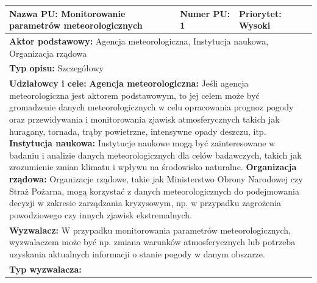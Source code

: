 \documentclass{article}
\begin{document}
\begin{center}
    \begin{center}
        \begin{tabular}{|l|l|l|}
        \hline
        \textbf{Nazwa PU:} Monitorowanie parametrów meteorologicznych & \textbf{Numer PU:} 1 & \textbf{Priorytet:} Wysoki \\
        \hline
        \hline
        \multicolumn{3}{|p{\dimexpr\linewidth-2\tabcolsep-2\arrayrulewidth}|}{\textbf{Aktor podstawowy:} Agencja meteorologiczna, Instytucja naukowa, Organizacja rządowa} \\
        \hline
        \hline
        \multicolumn{3}{|p{\dimexpr\linewidth-2\tabcolsep-2\arrayrulewidth}|}{\textbf{Typ opisu:} Szczegółowy} \\
        \hline
        \hline
        \multicolumn{3}{|p{\dimexpr\linewidth-2\tabcolsep-2\arrayrulewidth}|}{\textbf{Udziałowcy i cele:}
        \newline
        \textbf{Agencja meteorologiczna:}
        \newline
        Jeśli agencja meteorologiczna jest aktorem podstawowym, 
        to jej celem może być gromadzenie danych meteorologicznych w celu opracowania prognoz pogody
        oraz przewidywania i monitorowania zjawisk atmosferycznych takich jak huragany, tornada, trąby powietrzne,
        intensywne opady deszczu, itp.
        \newline 
        \textbf{Instytucja naukowa:}
        \newline
        Instytucje naukowe mogą być zainteresowane w badaniu i analizie danych meteorologicznych 
        dla celów badawczych, takich jak zrozumienie zmian klimatu i wpływu na środowisko naturalne.
        \newline
        \textbf{Organizacja rządowa:}
        \newline
        Organizacje rządowe, takie jak Ministerstwo Obrony Narodowej czy Straż Pożarna, mogą korzystać z
        danych meteorologicznych do podejmowania decyzji w zakresie zarządzania kryzysowym, np. w przypadku zagrożenia powodziowego
        czy innych zjawisk ekstremalnych. } \\
        \hline
        \hline
        \multicolumn{3}{|p{\dimexpr\linewidth-2\tabcolsep-2\arrayrulewidth}|}{\textbf{Wyzwalacz:} 
        W przypadku monitorowania parametrów meteorologicznych, wyzwalaczem może być np. zmiana
        warunków atmosferycznych lub potrzeba uzyskania aktualnych informacji o stanie pogody w danym obszarze.} \\
        \hline
        \hline
        \multicolumn{3}{|p{\dimexpr\linewidth-2\tabcolsep-2\arrayrulewidth}|}{\textbf{Typ wyzwalacza:}
}
\end{tabular}
\end{center}
\end{center}
\end{document}
